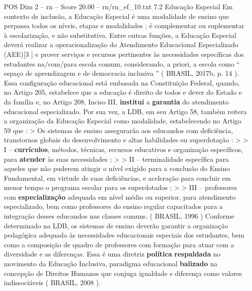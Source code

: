 \begin{textsample}{POS Dim 2 – rn – Score 20.00 – rn/rn\_ef\_10.txt}  \label{ex:f2_pos_247}
7.2 Educação Especial Em contexto de inclusão, a Educação Especial é uma modalidade de ensino que perpassa todos os níveis, etapas e modalidades ; é complementar ou suplementar à escolarização, e não substitutiva.
Entre outras funções, a Educação Especial deverá realizar a operacionalização do Atendimento Educacional Especializado (AEE)[3 ] e prover serviços e recursos pertinentes às necessidades específicas dos estudantes na/com/para escola comum, considerando, a priori, a escola como “ espaço de aprendizagem e de democracia inclusiva ” ( BRASIL, 2017b, p. 14 ).
Essa configuração educacional está embasada na Constituição Federal, quando, no Artigo 205, estabelece que a educação é direito de todos e dever do Estado e da família e, no Artigo 208, Inciso III, \textbf{institui} a \textbf{garantia} do atendimento educacional especializado.
Por sua vez, a LDB, em seu Artigo 58, também reitera a organização da Educação Especial como modalidade, estabelecendo no Artigo 59 que : > Os sistemas de ensino assegurarão aos educandos com deficiência, transtornos globais do desenvolvimento e altas habilidades ou superdotação : > > I – \textbf{currículos}, métodos, técnicas, recursos educativos e organização específicos, para \textbf{atender} às suas necessidades ; > > II – terminalidade específica para aqueles que não puderem atingir o nível exigido para a conclusão do Ensino Fundamental, em virtude de suas deficiências, e aceleração para concluir em menor tempo o programa escolar para os superdotados ; > > III – professores com \textbf{especialização} adequada em nível médio ou superior, para atendimento especializado, bem como professores do ensino regular capacitados para a integração desses educandos nas classes comuns. ( BRASIL, 1996 ) Conforme determinado na LDB, os sistemas de ensino deverão garantir a organização pedagógica adequada às necessidades educacionais especiais dos estudantes, bem como a composição de quadro de professores com formação para atuar com a diversidade e as diferenças.
Essa é uma diretriz \textbf{política} \textbf{respaldada} no movimento da Educação Inclusiva, paradigma educacional \textbf{balizado} na concepção de Direitos Humanos que conjuga igualdade e diferença como valores indissociáveis ( BRASIL, 2008 ).

\end{textsample}
